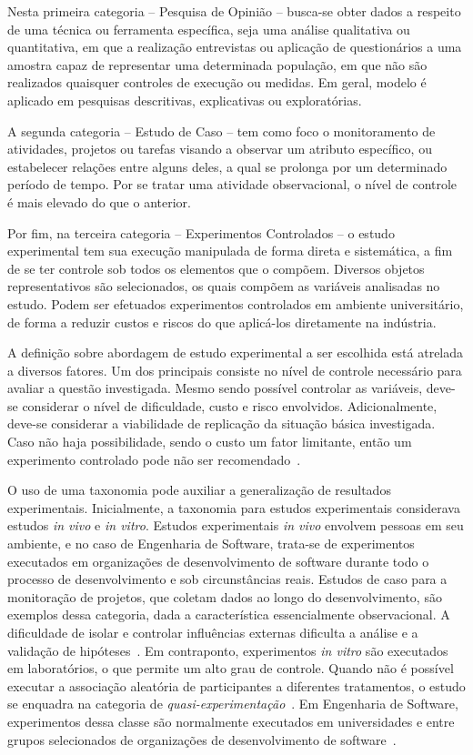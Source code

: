 Nesta primeira categoria -- Pesquisa de Opinião -- busca-se obter dados a respeito de uma técnica ou ferramenta específica, seja uma análise qualitativa ou quantitativa, em que a realização entrevistas ou aplicação de questionários a uma amostra capaz de representar uma determinada população, em que não são realizados quaisquer controles de execução ou medidas. Em geral, modelo é aplicado em pesquisas descritivas, explicativas ou exploratórias.

A segunda categoria -- Estudo de Caso -- tem como foco o monitoramento de atividades, projetos ou tarefas visando a observar um atributo específico, ou estabelecer relações entre alguns deles, a qual se prolonga por um determinado período de tempo. Por se tratar uma atividade observacional, o nível de controle é mais elevado do que o anterior.

Por fim, na terceira categoria -- Experimentos Controlados -- o estudo experimental tem sua execução manipulada de forma direta e sistemática, a fim de se ter controle sob todos os elementos que o compõem. Diversos objetos representativos são selecionados, os quais compõem as variáveis analisadas no estudo. Podem ser efetuados experimentos controlados em ambiente universitário, de forma a reduzir custos e riscos do que aplicá-los diretamente na indústria.

A definição sobre abordagem de estudo experimental a ser escolhida está atrelada a diversos fatores. Um dos principais consiste no nível de controle necessário para avaliar a questão investigada. Mesmo sendo possível controlar as variáveis, deve-se considerar o nível de dificuldade, custo e risco envolvidos. Adicionalmente, deve-se considerar a viabilidade de replicação da situação básica investigada. Caso não haja possibilidade, sendo o custo um fator limitante, então um experimento controlado pode não ser recomendado~\cite{kitchenham1997desmet}. 

O uso de uma taxonomia pode auxiliar a generalização de resultados experimentais. Inicialmente, a taxonomia para estudos experimentais considerava estudos \textit{in vivo} e \textit{in vitro}. Estudos experimentais \textit{in vivo} envolvem pessoas em seu ambiente, e no caso de Engenharia de Software, trata-se de experimentos executados em organizações de desenvolvimento de software durante todo o processo de desenvolvimento e sob circunstâncias reais. Estudos de caso para a monitoração de projetos, que coletam dados ao longo do desenvolvimento, são exemplos dessa categoria, dada a característica essencialmente observacional. A dificuldade de isolar e controlar influências externas dificulta a análise e a validação de hipóteses~\cite{Wohlin2012}.
Em contraponto, experimentos \textit{in vitro} são executados em laboratórios, o que permite um alto grau de controle. Quando não é possível executar a associação aleatória de participantes a diferentes tratamentos, o estudo se enquadra na categoria de \textit{quasi-experimentação}~\cite{Wohlin2012}. Em Engenharia de Software, experimentos dessa classe são normalmente executados em universidades e entre grupos selecionados de organizações de desenvolvimento de software~\cite{travassos2003contributions}.

